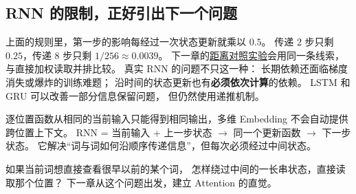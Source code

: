 \subsection{RNN 的限制，正好引出下一个问题}
\label{concept:long-term-dependency}
\label{concept:lstm}

上面的规则里，第一步的影响每经过一次状态更新就乘以 $0.5$。
传递 $2$ 步只剩 $0.25$，传递 $8$ 步只剩 $1/256\approx0.0039$。
下一章的\hyperref[experiment:distance-reading]{距离对照实验}会用同一条线索，与直接加权读取并排比较。
真实 RNN 的问题不只这一种：
长期依赖还面临梯度消失或爆炸的训练难题；
沿时间的状态更新也有\textbf{必须依次计算}的依赖。
LSTM 和 GRU 可以改善一部分信息保留问题，
但仍然使用递推机制。




\par\smallskip
逐位置函数从相同的当前输入只能得到相同输出，多维 Embedding 不会自动提供跨位置上下文。
RNN = 当前输入 + 上一步状态 $\to$ 同一个更新函数 $\to$ 下一步状态。
它解决“词与词如何沿顺序传递信息”，但每次必须经过中间状态。

如果当前词想直接查看很早以前的某个词，
怎样绕过中间的一长串状态，直接读取那个位置？
下一章从这个问题出发，建立 Attention 的直觉。
